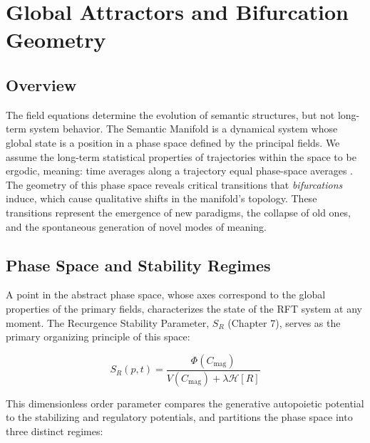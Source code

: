 \chapter{Global Attractors and Bifurcation Geometry}
\label{11:global_attractors_and_bifurcation_geometry}


\section{Overview}
\label{11.1:overview}

The field equations determine the evolution of semantic structures, but not long-term system behavior. The Semantic Manifold is a dynamical system whose global state is a position in a phase space defined by the principal fields. We assume the long-term statistical properties of trajectories within the space to be ergodic, meaning: time averages along a trajectory equal phase-space averages \autocite{Birkhoff1931}. The geometry of this phase space reveals critical transitions that \textit{bifurcations} induce, which cause qualitative shifts in the manifold's topology. These transitions represent the emergence of new paradigms, the collapse of old ones, and the spontaneous generation of novel modes of meaning.


\section{Phase Space and Stability Regimes}
\label{11.2:phase_space_and_stability_regimes}

A point in the abstract phase space, whose axes correspond to the global properties of the primary fields, characterizes the state of the RFT system at any moment. The Recurgence Stability Parameter, \(S_R\) (Chapter 7), serves as the primary organizing principle of this space:

\begin{equation}
S_R(p,t) = \frac{\Phi(C_{\mathrm{mag}})}{V(C_{\mathrm{mag}}) + \lambda \mathcal{H}[R]}
\end{equation}

This dimensionless order parameter compares the generative autopoietic potential to the stabilizing and regulatory potentials, and partitions the phase space into three distinct regimes:

